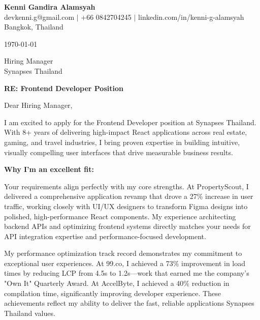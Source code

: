 \documentclass[11pt]{article}
\begin{document}
\begin{center}
    {\LARGE \textbf{Kenni Gandira Alamsyah}}\\[0.3cm]
    devkenni.g@gmail.com $|$ +66 0842704245 $|$ linkedin.com/in/kenni-g-alamsyah\\[0.3cm]
    Bangkok, Thailand
\end{center}

\vspace{1cm}

\noindent
\today

\vspace{0.5cm}

\noindent
Hiring Manager\\
Synapses Thailand\\

\vspace{0.5cm}

\noindent
\textbf{RE: Frontend Developer Position}

\vspace{0.5cm}

\noindent
Dear Hiring Manager,

\vspace{0.3cm}

I am excited to apply for the Frontend Developer position at Synapses Thailand. With 8+ years of delivering high-impact React applications across real estate, gaming, and travel industries, I bring proven expertise in building intuitive, visually compelling user interfaces that drive measurable business results.

\vspace{0.3cm}

\noindent
\textbf{Why I'm an excellent fit:}

\vspace{0.3cm}

Your requirements align perfectly with my core strengths. At PropertyScout, I delivered a comprehensive application revamp that drove a 27\% increase in user traffic, working closely with UI/UX designers to transform Figma designs into polished, high-performance React components. My experience architecting backend APIs and optimizing frontend systems directly matches your needs for API integration expertise and performance-focused development.

\vspace{0.3cm}

My performance optimization track record demonstrates my commitment to exceptional user experiences. At 99.co, I achieved a 73\% improvement in load times by reducing LCP from 4.5s to 1.2s—work that earned me the company's "Own It" Quarterly Award. At AccelByte, I achieved a 40\% reduction in compilation time, significantly improving developer experience. These achievements reflect my ability to deliver the fast, reliable applications Synapses Thailand values.
\end{document}
